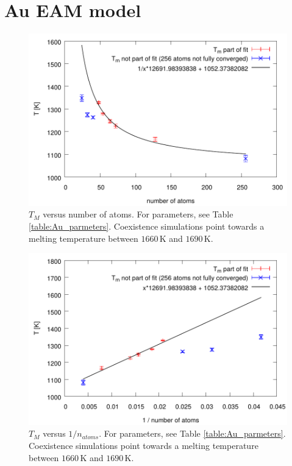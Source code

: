 \documentclass[aps,jcp,preprint,superscriptaddress]{revtex4}
\begin{document}
\section{Au EAM model}
\vspace{3cm}
\begin{figure}[hbt]
\begin{center}
\includegraphics[width=13.1cm]{Au_melting_temperatures_with_fit.pdf}
\end{center}
\vspace{-20pt}
\caption {$T_M$ versus number of atoms. For parameters, see Table \ref{table:Au_parmeters}. Coexistence simulations point towards a melting temperature between $1660$\,K and $1690$\,K.}
\label{fig:mW}
\end{figure}

\begin{figure}[hbt]
\begin{center}
\includegraphics[width=13.1cm]{Au_melting_temperatures_with_fit_1_over_N.pdf}
\end{center}
\vspace{-20pt}
\caption {$T_M$ versus $1/n_{atoms}$. For parameters, see Table \ref{table:Au_parmeters}. Coexistence simulations point towards a melting temperature between $1660$\,K and $1690$\,K.}
\label{fig:mW}
\end{figure}
\end{document}
